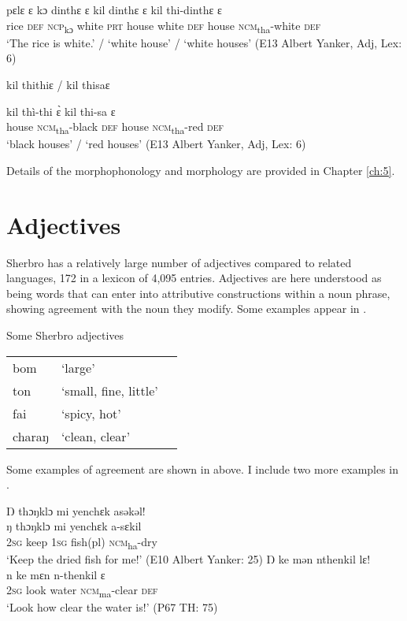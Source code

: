         \gll pɛlɛ  ɛ    kɔ    dinthɛ  ɛ    kil      dinthɛ  ɛ    kil      thi-dinthɛ    ɛ\\
        rice  \textsc{def}  \textsc{ncp}\textsubscript{kɔ}  white    \textsc{prt}  house    white    \textsc{def}  house    \textsc{ncm}\textsubscript{tha}{}-white  \textsc{def}\\
    \glt ‘The rice is white.' / ‘white house' / ‘white houses' (E13 Albert Yanker, Adj, Lex: 6)

    \newpage
    \ex kil thithiɛ / kil thisaɛ

    \gll kil      thì-thi      ɛ̀      kil      thi-sa      ɛ\\
    house    \textsc{ncm}\textsubscript{tha}{}-black  \textsc{def}    house    \textsc{ncm}\textsubscript{tha}{}-red  \textsc{def}\\
    \glt ‘black houses' / ‘red houses' (E13 Albert Yanker, Adj, Lex: 6)
    \z
    \z

Details of the morphophonology and morphology are provided in Chapter \ref{ch:5}.

\section{Adjectives}
\label{sec:3.2}\hypertarget{Toc115517761}{}
Sherbro has a relatively large number of adjectives compared to related languages, 172 in a lexicon of 4,095 entries. Adjectives are here understood as being words that can enter into attributive constructions within a noun phrase, showing agreement with the noun they modify. Some examples appear in .

\ea%
    \label{ex:47} 
    Some Sherbro adjectives\\

    \vspace{6pt}
    
\begin{tabular}[t]{lll}
bom & ‘large'\\
ton & ‘small, fine, little'\\
fai & ‘spicy, hot'\\
charaŋ & ‘clean, clear'\\
\end{tabular}
\z

Some examples of agreement are shown in  above. I include two more examples in .

\ea%
    \label{ex:48}
    \ea Ŋ thɔŋklɔ mi yenchɛk asəkəl!\\
    \gll ŋ    thɔŋklɔ  mi    yenchɛk    a-sɛkil\\
      \textsc{2sg}  keep    \textsc{1sg}  fish(pl)    \textsc{ncm}\textsubscript{ha}{}-dry\\
    \glt ‘Keep the dried fish for me!' (E10 Albert Yanker: 25)
    \ex Ŋ ke mən nthenkil   lɛ!\\
    \gll n    ke    mɛn    n-thenkil    ɛ\\
    \textsc{2sg}  look   water    \textsc{ncm}\textsubscript{ma}{}-clear   \textsc{def}\\
    \glt ‘Look how clear the water is!' (P67 TH: 75)
    \z
    \z

